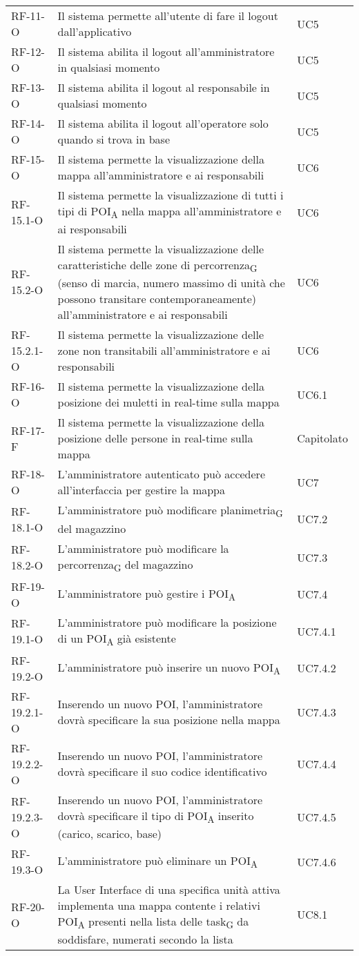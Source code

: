 \begin{longtable}{ 
		>{}p{} 
		>{}p{}
		>{}p{} }
RF-11-O & Il sistema permette all'utente di fare il logout dall'applicativo & UC5\tabularnewline
RF-12-O & Il sistema abilita il logout all'amministratore in qualsiasi momento & UC5\tabularnewline
RF-13-O & Il sistema abilita il logout al responsabile in qualsiasi momento & UC5\tabularnewline
RF-14-O & Il sistema abilita il logout all'operatore solo quando si trova in base & UC5\tabularnewline
RF-15-O & Il sistema permette la visualizzazione della mappa all’amministratore e ai responsabili & UC6\tabularnewline
RF-15.1-O & Il sistema permette la visualizzazione di tutti i tipi di \acrshort{POI}\textsubscript{A} nella mappa all’amministratore e ai responsabili & UC6\tabularnewline
RF-15.2-O & Il sistema permette la visualizzazione delle caratteristiche delle zone di \gls{percorrenza}\textsubscript{G} (senso di marcia, numero massimo di unità che possono transitare contemporaneamente) all’amministratore e ai responsabili & UC6\tabularnewline
RF-15.2.1-O & Il sistema permette la visualizzazione delle zone non transitabili all’amministratore e ai responsabili & UC6\tabularnewline
RF-16-O & Il sistema permette la visualizzazione della posizione dei muletti in real-time sulla mappa & UC6.1\tabularnewline
RF-17-F & Il sistema permette la visualizzazione della posizione delle persone in real-time sulla mappa & Capitolato\tabularnewline
RF-18-O & L’amministratore autenticato può accedere all’interfaccia per gestire la mappa  & UC7\tabularnewline
RF-18.1-O & L’amministratore può modificare \gls{planimetria}\textsubscript{G} del magazzino & UC7.2\tabularnewline
RF-18.2-O & L’amministratore può modificare la \gls{percorrenza}\textsubscript{G} del magazzino & UC7.3\tabularnewline
RF-19-O & L’amministratore può gestire i \acrshort{POI}\textsubscript{A} & UC7.4\tabularnewline
RF-19.1-O & L'amministratore può modificare la posizione di un \acrshort{POI}\textsubscript{A} già esistente & UC7.4.1\tabularnewline
RF-19.2-O & L'amministratore può inserire un nuovo \acrshort{POI}\textsubscript{A} & UC7.4.2\tabularnewline
RF-19.2.1-O & Inserendo un nuovo POI, l'amministratore dovrà specificare la sua posizione nella mappa & UC7.4.3\tabularnewline
RF-19.2.2-O & Inserendo un nuovo POI, l'amministratore dovrà specificare il suo codice identificativo & UC7.4.4\tabularnewline
RF-19.2.3-O & Inserendo un nuovo POI, l'amministratore dovrà specificare il tipo di \acrshort{POI}\textsubscript{A} inserito (carico, scarico, base) & UC7.4.5\tabularnewline
RF-19.3-O & L'amministratore può eliminare un \acrshort{POI}\textsubscript{A} & UC7.4.6\tabularnewline
RF-20-O & La User Interface di una specifica unità attiva implementa una mappa contente i relativi \acrshort{POI}\textsubscript{A} presenti nella lista delle \gls{task}\textsubscript{G} da soddisfare, numerati secondo la lista & UC8.1\tabularnewline

\end{longtable}
